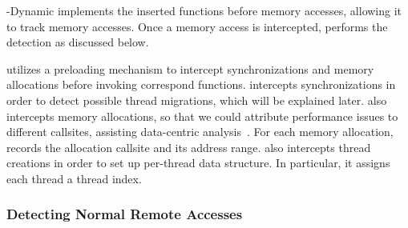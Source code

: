\NP{}-Dynamic implements the inserted functions before memory accesses, allowing it to track memory accesses. Once a memory access is intercepted, \NP{} performs the detection as discussed below. 

\NP{} utilizes a preloading mechanism to intercept synchronizations and memory allocations before invoking correspond functions.
\NP{} intercepts synchronizations in order to detect possible thread migrations, which will be explained later. \NP{} also intercepts memory allocations, so that we could attribute performance issues to different callsites, assisting data-centric analysis~\cite{XuNuma}. For each memory allocation, \NP{} records the allocation callsite and its address range. 
\NP{} also intercepts thread creations in order to set up per-thread data structure. 
In particular, it assigns each thread a thread index.


\subsubsection{Detecting Normal Remote Accesses}


